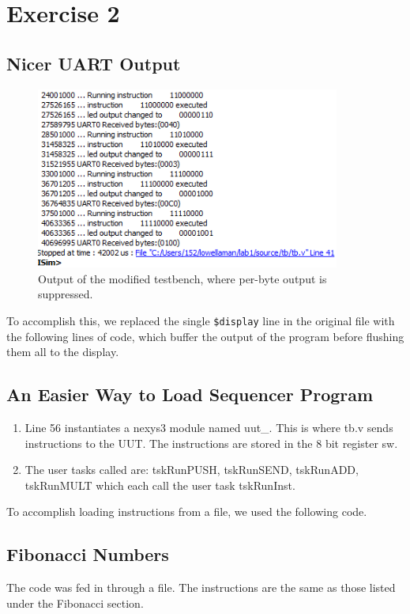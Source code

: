 \documentclass[]{article}
\begin{document}
\section{Exercise 2}


\subsection{Nicer UART Output}
\begin{figure}[H]
\centering
\includegraphics[width=10cm]{nicerUART.PNG}
\caption{Output of the modified testbench, where per-byte output is suppressed.}
\end{figure}

To accomplish this, we replaced the single \texttt{\$display} line in the original file with the following lines of code, which buffer the output of the program before flushing them all to the display.



\subsection{An Easier Way to Load Sequencer Program}

\begin{enumerate}
\item Line 56 instantiates a nexys3 module named uut\_. This is where tb.v sends instructions to the UUT. The instructions are stored in the 8 bit register sw.



\item The user tasks called are: tskRunPUSH, tskRunSEND, tskRunADD, tskRunMULT which each call the user task tskRunInst.
\end{enumerate}

To accomplish loading instructions from a file, we used the following code.



\subsection{Fibonacci Numbers}

The code was fed in through a file. The instructions are the same as those listed under the Fibonacci section.
\end{document}
